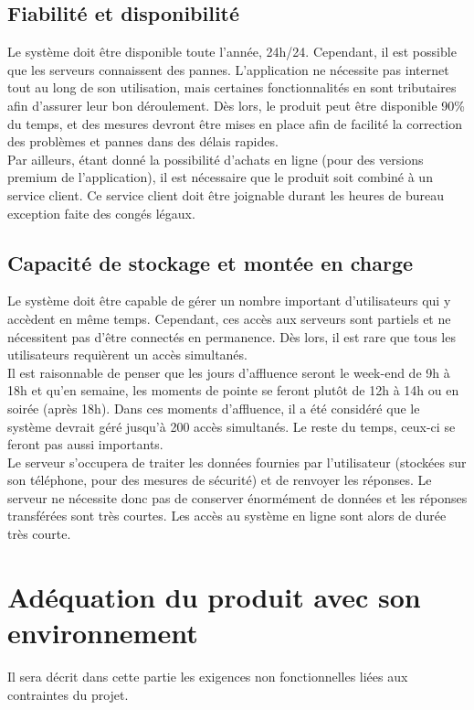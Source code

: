 \subsection*{Fiabilité et disponibilité}
Le système doit être disponible toute l'année, 24h/24. Cependant, il est possible que les serveurs connaissent des pannes. L'application ne nécessite pas internet tout au long de son utilisation, mais certaines fonctionnalités en sont tributaires afin d'assurer leur bon déroulement. Dès lors, le produit peut être disponible 90\% du temps, et des mesures devront être mises en place afin de facilité la correction des problèmes et pannes dans des délais rapides.\\

Par ailleurs, étant donné la possibilité d'achats en ligne (pour des versions premium de l'application), il est nécessaire que le produit soit combiné à un service client. Ce service client doit être joignable durant les heures de bureau exception faite des congés légaux.


\subsection*{Capacité de stockage et montée en charge}
Le système doit être capable de gérer un nombre important d'utilisateurs qui y accèdent en même temps. Cependant, ces accès aux serveurs sont partiels et ne nécessitent pas d'être connectés en permanence. Dès lors, il est rare que tous les utilisateurs requièrent un accès simultanés.\\

Il est raisonnable de penser que les jours d'affluence seront le week-end de 9h à 18h et qu'en semaine, les moments de pointe se feront plutôt de 12h à 14h ou en soirée (après 18h). Dans ces moments d'affluence, il a été considéré que le système devrait géré jusqu'à 200 accès simultanés. Le reste du temps, ceux-ci se feront pas aussi importants.\\

Le serveur s'occupera de traiter les données fournies par l'utilisateur (stockées sur son téléphone, pour des mesures de sécurité) et de renvoyer les réponses. Le serveur ne nécessite donc pas de conserver énormément de données et les réponses transférées sont très courtes. Les accès au système en ligne sont alors de durée très courte.

\section{Adéquation du produit avec son environnement}
Il sera décrit dans cette partie les exigences non fonctionnelles liées aux contraintes du projet.

